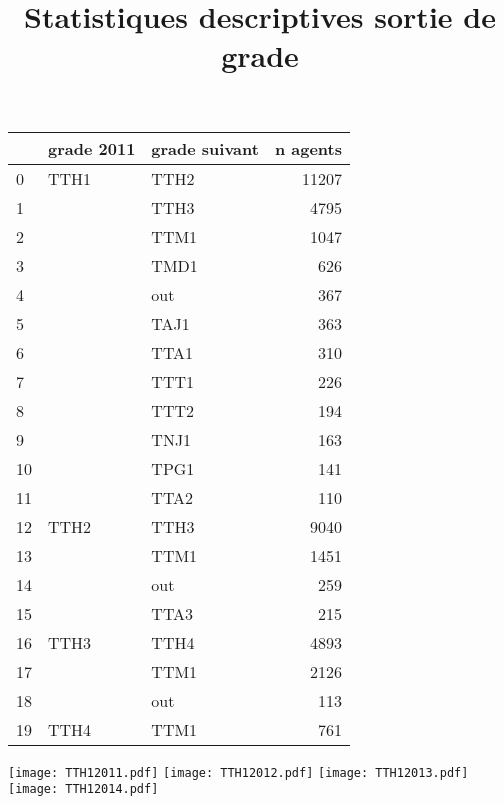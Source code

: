 \documentclass[11pt,a4paper]{article}
\begin{document}
\title{Statistiques descriptives sortie de grade}

\begin{tabular}{lllr}
	\toprule
	{} & grade 2011 & grade suivant &  n agents \\
	\midrule
	0  &       TTH1 &       TTH2 &  11207 \\
	1  &        &       TTH3 &   4795 \\
	2  &        &       TTM1 &   1047 \\
	3  &        &       TMD1 &    626 \\
	4  &        &        out &    367 \\
	5  &        &       TAJ1 &    363 \\
	6  &        &       TTA1 &    310 \\
	7  &        &       TTT1 &    226 \\
	8  &        &       TTT2 &    194 \\
	9  &        &       TNJ1 &    163 \\
	10 &        &       TPG1 &    141 \\
	11 &        &       TTA2 &    110 \\
	12 &       TTH2 &       TTH3 &   9040 \\
	13 &        &       TTM1 &   1451 \\
	14 &        &        out &    259 \\
	15 &        &       TTA3 &    215 \\
	16 &       TTH3 &       TTH4 &   4893 \\
	17 &        &       TTM1 &   2126 \\
	18 &        &        out &    113 \\
	19 &       TTH4 &       TTM1 &    761 \\
	\bottomrule
\end{tabular}

\begin{center}
	\texttt{[image: TTH12011.pdf]}
	\texttt{[image: TTH12012.pdf]}
	\texttt{[image: TTH12013.pdf]}
	\texttt{[image: TTH12014.pdf]}
\end{center}

\author{}


\maketitle

\end{document}
